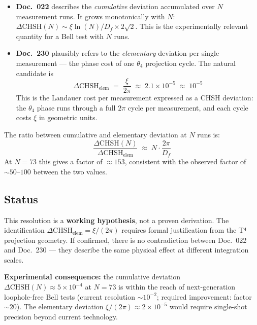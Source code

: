 \begin{itemize}
  \item \textbf{Doc.~022} describes the \emph{cumulative} deviation
        accumulated over $N$ measurement runs. It grows monotonically
        with $N$: $\Delta\text{CHSH}(N) \sim \xi\ln(N)/D_f \times 2\sqrt{2}$.
        This is the experimentally relevant quantity for a Bell test
        with $N$ runs.

  \item \textbf{Doc.~230} plausibly refers to the \emph{elementary}
        deviation per single measurement — the phase cost of one
        $\theta_4$ projection cycle. The natural candidate is
        \begin{equation}
          \Delta\text{CHSH}_\text{elem}
          \;=\; \frac{\xi}{2\pi}
          \;\approx\; 2.1\times10^{-5}
          \;\approx\; 10^{-5}
          \tag{190.21}
        \end{equation}
        This is the Landauer cost per measurement expressed as a
        CHSH deviation: the $\theta_4$ phase runs through a full
        $2\pi$ cycle per measurement, and each cycle costs $\xi$
        in geometric units.
\end{itemize}

The ratio between cumulative and elementary deviation at $N$ runs is:
\begin{equation}
  \frac{\Delta\text{CHSH}(N)}{\Delta\text{CHSH}_\text{elem}}
  \;\approx\; N\cdot\frac{2\pi}{D_f}
  \tag{190.22}
\end{equation}
At $N=73$ this gives a factor of $\approx 153$, consistent with the
observed factor of $\sim 50$--$100$ between the two values.

\subsection*{Status}

This resolution is a \textbf{working hypothesis}, not a proven derivation.
The identification $\Delta\text{CHSH}_\text{elem} = \xi/(2\pi)$ requires
formal justification from the T⁴ projection geometry. If confirmed, there
is no contradiction between Doc.~022 and Doc.~230 — they describe
the same physical effect at different integration scales.

\textbf{Experimental consequence:} the cumulative deviation
$\Delta\text{CHSH}(N) \approx 5\times10^{-4}$ at $N=73$ is within
the reach of next-generation loophole-free Bell tests
(current resolution $\sim10^{-2}$; required improvement: factor $\sim20$).
The elementary deviation $\xi/(2\pi) \approx 2\times10^{-5}$ would
require single-shot precision beyond current technology.


